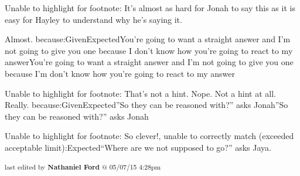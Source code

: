 	Unable to highlight for footnote: It's almost as hard for Jonah to say this as it is easy for Hayley to understand why he's saying it.

Almost. because:GivenExpectedYou’re going to want a straight answer and I’m not going to give you one because I don’t know how you’re going to react to my answerYou’re going to want a straight answer and I’m not going to give you one because I’m don’t know how you’re going to react to my answer

	Unable to highlight for footnote: That's not a hint.  Nope.  Not a hint at all.  Really. because:GivenExpected”So they can be reasoned with?” asks Jonah”So they can be reasoned with?” asks Jonah

	Unable to highlight for footnote: So clever!, unable to correctly match (exceeded acceptable limit):Expected“Where are we not supposed to go?” asks Jaya.


\fi

\vspace{\fill}

\begin{flushright}
\textsubscript{last edited by \textbf{Nathaniel Ford} @ 05/07/15 4:28pm}
\end{flushright}


